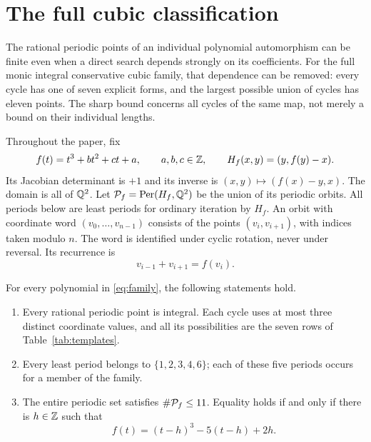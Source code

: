 \section{The full cubic classification}
\label{sec:introduction}

The rational periodic points of an individual polynomial automorphism
can be finite even when a direct search depends strongly on its
coefficients. For the full monic integral conservative cubic family,
that dependence can be removed: every cycle has one of seven explicit
forms, and the largest possible union of cycles has eleven points.
The sharp bound concerns all cycles of the same map, not merely a
bound on their individual lengths.

Throughout the paper, fix
\begin{equation}
 f(t)=t^3+bt^2+ct+a,\qquad a,b,c\in\mathbb{Z},\qquad
 H_f(x,y)=(y,f(y)-x).
 \label{eq:family}
\end{equation}
Its Jacobian determinant is $+1$ and its inverse is
$(x,y)\mapsto(f(x)-y,x)$. The domain is all of $\mathbb{Q}^2$.
Let $\mathcal{P}_f=\operatorname{Per}(H_f,\mathbb{Q}^2)$ be the union of its periodic orbits.
All periods below are least periods for ordinary iteration by $H_f$.
An orbit with coordinate word $(v_0,\ldots,v_{n-1})$ consists of
the points $(v_i,v_{i+1})$, with indices taken modulo $n$.
The word is identified under cyclic rotation, never under reversal.
Its recurrence is
\begin{equation}
 v_{i-1}+v_{i+1}=f(v_i).
 \label{eq:recurrence}
\end{equation}

\begin{theorem}
\label{thm:main}
For every polynomial in \eqref{eq:family}, the following statements hold.
\begin{enumerate}
\item Every rational periodic point is integral. Each cycle uses at
most three distinct coordinate values, and all its possibilities are
the seven rows of Table~\ref{tab:templates}.
\item Every least period belongs to $\{1,2,3,4,6\}$; each of these
five periods occurs for a member of the family.
\item The entire periodic set satisfies $\#\mathcal{P}_f\le11$. Equality
holds if and only if there is $h\in\mathbb{Z}$ such that
\begin{equation}
 f(t)=(t-h)^3-5(t-h)+2h.
 \label{eq:equality-family}
\end{equation}
\end{enumerate}
\end{theorem}

